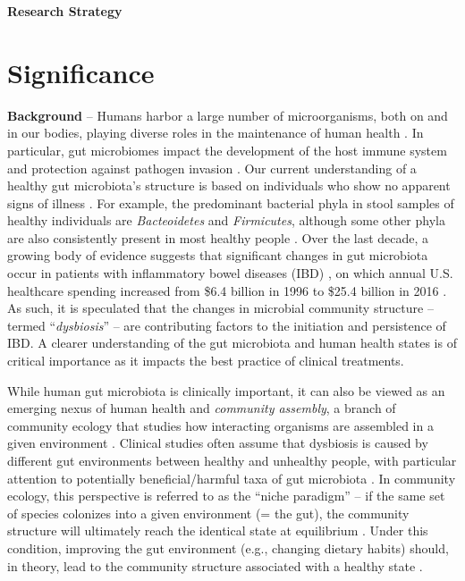 \documentclass[12pt, class=article, crop=false]{standalone}
\begin{document}
\textbf{Research Strategy}

\section{Significance}

\textbf{Background} --
Humans harbor a large number of microorganisms, both on and in our bodies, playing diverse roles in the maintenance of human health \citep{fierer_animalcules_2012}.
In particular, gut microbiomes impact the development of the host immune system and protection against pathogen invasion \citep{fierer_animalcules_2012, petersen_defining_2014}.
Our current understanding of a healthy gut microbiota's structure is based on individuals who show no apparent signs of illness \citep{petersen_defining_2014}.
For example, the predominant bacterial phyla in stool samples of healthy individuals are \textit{Bacteoidetes} and \textit{Firmicutes}, although some other phyla are also consistently present in most healthy people \citep{petersen_defining_2014}.
Over the last decade, a growing body of evidence suggests that significant changes in gut microbiota occur in patients with inflammatory bowel diseases (IBD) \citep{frank_molecular-phylogenetic_2007, karlsson_gut_2013, abrahamsson_low_2014, parracho_differences_2005}, on which annual U.S. healthcare spending increased from \$6.4 billion in 1996 to \$25.4 billion in 2016 \citep{singh_trends_2022}.
As such, it is speculated that the changes in microbial community structure -- termed ``\textit{dysbiosis}'' -- are contributing factors to the initiation and persistence of IBD.
A clearer understanding of the gut microbiota and human health states is of critical importance as it impacts the best practice of clinical treatments. 

While human gut microbiota is clinically important, it can also be viewed as an emerging nexus of human health and \textit{community assembly}, a branch of community ecology that studies how interacting organisms are assembled in a given environment \citep{fukami_historical_2015, sprockett_role_2018}.
Clinical studies often assume that dysbiosis is caused by different gut environments between healthy and unhealthy people, with particular attention to potentially beneficial/harmful taxa of gut microbiota \citep{petersen_defining_2014}.
In community ecology, this perspective is referred to as the ``niche paradigm'' -- if the same set of species colonizes into a given environment (= the gut), the community structure will ultimately reach the identical state at equilibrium \citep{chase_community_2003}.
Under this condition, improving the gut environment (e.g., changing dietary habits) should, in theory, lead to the community structure associated with a healthy state \citep{chase_community_2003, leibold_metacommunity_2004, fukami_historical_2015}.
\end{document}
